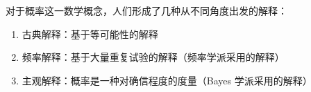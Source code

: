 \documentclass[../main.tex]{subfiles}
\begin{document}
对于概率这一数学概念，人们形成了几种从不同角度出发的解释：
\begin{enumerate}
    \item 古典解释：基于等可能性的解释
    \item 频率解释：基于大量重复试验的解释（频率学派采用的解释）
    \item 主观解释：概率是一种对确信程度的度量（Bayes 学派采用的解释）
\end{enumerate}
\end{document}
